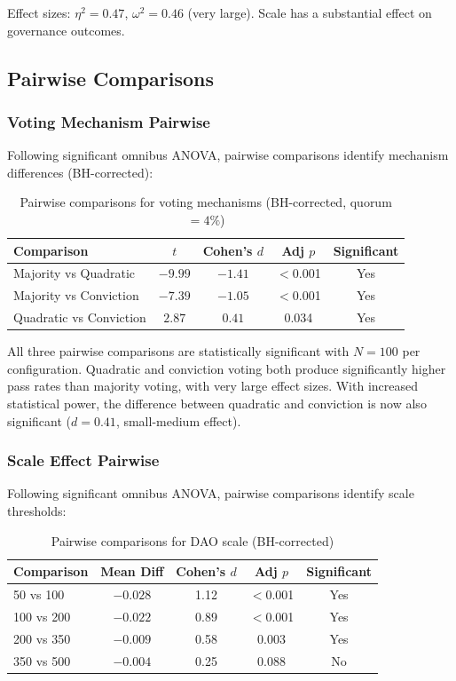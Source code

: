 Effect sizes: $\eta^2 = 0.47$, $\omega^2 = 0.46$ (very large). Scale has a substantial effect on governance outcomes.

\subsection{Pairwise Comparisons}

\subsubsection{Voting Mechanism Pairwise}

Following significant omnibus ANOVA, pairwise comparisons identify mechanism differences (BH-corrected):

\begin{table}[htbp]
\centering
\caption{Pairwise comparisons for voting mechanisms (BH-corrected, quorum $= 4\%$)}
\label{tab:voting-pairwise}
\begin{tabular}{lcccc}
\toprule
Comparison & $t$ & Cohen's $d$ & Adj $p$ & Significant \\
\midrule
Majority vs Quadratic & $-9.99$ & $-1.41$ & $<$0.001 & Yes \\
Majority vs Conviction & $-7.39$ & $-1.05$ & $<$0.001 & Yes \\
Quadratic vs Conviction & $2.87$ & $0.41$ & 0.034 & Yes \\
\bottomrule
\end{tabular}
\end{table}

All three pairwise comparisons are statistically significant with $N=100$ per configuration. Quadratic and conviction voting both produce significantly higher pass rates than majority voting, with very large effect sizes. With increased statistical power, the difference between quadratic and conviction is now also significant ($d = 0.41$, small-medium effect).

\subsubsection{Scale Effect Pairwise}

Following significant omnibus ANOVA, pairwise comparisons identify scale thresholds:

\begin{table}[htbp]
\centering
\caption{Pairwise comparisons for DAO scale (BH-corrected)}
\label{tab:scale-pairwise}
\begin{tabular}{lcccc}
\toprule
Comparison & Mean Diff & Cohen's $d$ & Adj $p$ & Significant \\
\midrule
50 vs 100 & $-0.028$ & 1.12 & $<$0.001 & Yes \\
100 vs 200 & $-0.022$ & 0.89 & $<$0.001 & Yes \\
200 vs 350 & $-0.009$ & 0.58 & 0.003 & Yes \\
350 vs 500 & $-0.004$ & 0.25 & 0.088 & No \\
\bottomrule
\end{tabular}
\end{table}

